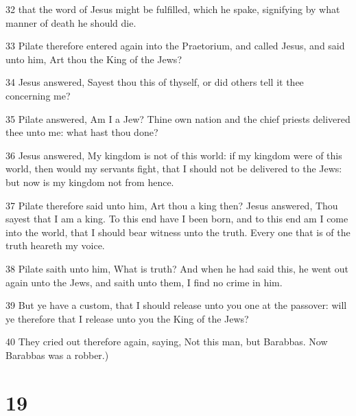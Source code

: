 \par 32 that the word of Jesus might be fulfilled, which he spake, signifying by what manner of death he should die.
\par 33 Pilate therefore entered again into the Praetorium, and called Jesus, and said unto him, Art thou the King of the Jews?
\par 34 Jesus answered, Sayest thou this of thyself, or did others tell it thee concerning me?
\par 35 Pilate answered, Am I a Jew? Thine own nation and the chief priests delivered thee unto me: what hast thou done?
\par 36 Jesus answered, My kingdom is not of this world: if my kingdom were of this world, then would my servants fight, that I should not be delivered to the Jews: but now is my kingdom not from hence.
\par 37 Pilate therefore said unto him, Art thou a king then? Jesus answered, Thou sayest that I am a king. To this end have I been born, and to this end am I come into the world, that I should bear witness unto the truth. Every one that is of the truth heareth my voice.
\par 38 Pilate saith unto him, What is truth? And when he had said this, he went out again unto the Jews, and saith unto them, I find no crime in him.
\par 39 But ye have a custom, that I should release unto you one at the passover: will ye therefore that I release unto you the King of the Jews?
\par 40 They cried out therefore again, saying, Not this man, but Barabbas. Now Barabbas was a robber.)

\chapter{19}

